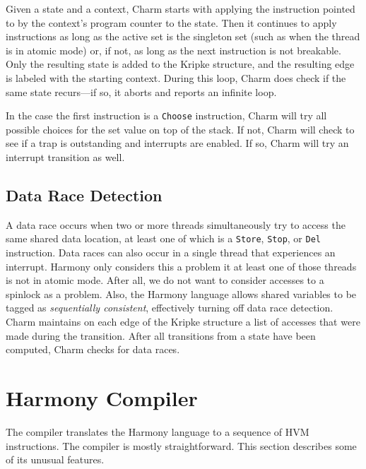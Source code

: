 \documentclass[twocolumn]{article}
\begin{document}
Given a state and a context, Charm starts with applying the instruction
pointed to by the context's program counter to the state.
Then it continues to apply instructions as long as
the active set is the singleton set (such as when the thread is in
atomic mode) or, if not, as long as the next instruction is not
breakable.  Only the resulting state is added to the Kripke structure,
and the resulting edge is labeled with the starting context.
During this loop, Charm
does check if the same state recurs---if so, it aborts
and reports an infinite loop.

In the case the first instruction is a \texttt{Choose} instruction,
Charm will try all possible choices for the set value
on top of the stack.  If not, Charm will check to
see if a trap is outstanding and interrupts are enabled.  If so,
Charm will try an interrupt transition as well.


\subsection{Data Race Detection}

A data race occurs when two or more threads simultaneously try to
access the same shared data location, at least one of which is a
\texttt{Store}, \texttt{Stop}, or \texttt{Del} instruction.  Data races
can also occur in a single thread that experiences an interrupt.  Harmony
only considers this a problem it at least one of those threads is
not in atomic mode.  After all, we do not want to consider accesses
to a spinlock as a problem.  Also, the Harmony language allows
shared variables to be tagged as \emph{sequentially consistent},
effectively turning off data race detection.  Charm maintains on
each edge of the Kripke structure a list of accesses that were made
during the transition.  After all transitions from a state have been
computed, Charm checks for data races.

\section{Harmony Compiler}

The compiler translates the Harmony language to a sequence of HVM
instructions.  The compiler is mostly straightforward.  This section
describes some of its unusual features.
\end{document}

